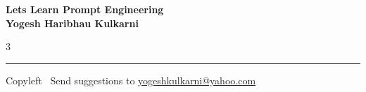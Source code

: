 \documentclass[8pt,landscape]{article}
\begin{document}
\footnotesize


\begin{center}
\Large{\textbf{Lets Learn Prompt Engineering\\ Yogesh Haribhau Kulkarni}}
\end{center}

\begin{multicols}{3}

\end{multicols}

\rule{\linewidth}{0.25pt}
\scriptsize
Copyleft \textcopyleft\  Send suggestions to
\href{http://www.yogeshkulkarni.com}{yogeshkulkarni@yahoo.com}
\end{document}
